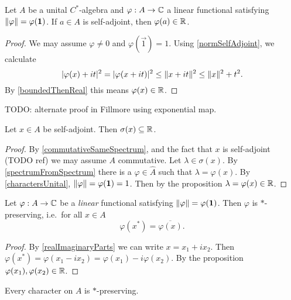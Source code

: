 \begin{proposition}
Let $A$ be a unital $C^*$-algebra and $\varphi: A\to \mathbb{C}$ a linear functional satisfying $\lVert\varphi\rVert = \varphi(\boldsymbol{\mathrm{1}})$. If $a\in A$ is self-adjoint, then $\varphi(a) \in \mathbb{R}$.
\end{proposition}
\begin{proof}
We may assume $\varphi \neq 0$ and $\varphi(\vec{1}) = 1$. Using \ref{normSelfAdjoint}, we calculate
\[ |\varphi(x)+it|^2 = |\varphi(x+it)|^2 \leq \lVert x+it\rVert^2 \leq \lVert x\rVert^2 + t^2. \]
By \ref{boundedThenReal} this means $\varphi(x)\in\mathbb{R}$.
\end{proof}
TODO: alternate proof in Fillmore using exponential map.
\begin{corollary} \label{selfAdjointSpectrumReal}
Let $x\in A$ be self-adjoint. Then $\sigma(x) \subseteq \mathbb{R}$.
\end{corollary}
\begin{proof}
By \ref{commutativeSameSpectrum}, and the fact that $x$ is self-adjoint (TODO ref) we may assume $A$ commutative. Let $\lambda \in \sigma(x)$. By \ref{spectrumFromSpectrum} there is a $\varphi\in\hat{A}$ such that $\lambda = \varphi(x)$. By \ref{charactersUnital}, $\lVert\varphi\rVert = \varphi(\boldsymbol{\mathrm{1}}) = 1$. Then by the proposition $\lambda = \varphi(x) \in \mathbb{R}$.
\end{proof}
\begin{corollary}
Let $\varphi:A\to \mathbb{C}$ be a \emph{linear} functional satisfying $\lVert\varphi\rVert = \varphi(\boldsymbol{\mathrm{1}})$. Then $\varphi$ is $*$-preserving, i.e.\ for all $x\in A$
\[\varphi(x^*) = \overline{\varphi(x)}. \] 
\end{corollary}
\begin{proof}
By \ref{realImaginaryParts} we can write $x= x_1+ix_2$. Then $\varphi(x^*) = \varphi(x_1-ix_2) = \varphi(x_1) - i \varphi(x_2)$. By the proposition $\varphi(x_1), \varphi(x_2)\in \mathbb{R}$.
\end{proof}
\begin{corollary} \label{characters*Preserving}
Every character on $A$ is $*$-preserving.
\end{corollary}


